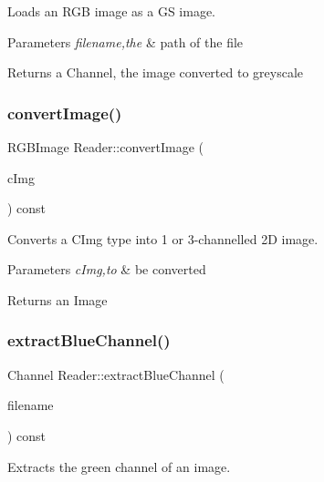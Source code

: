 Loads an R\+GB image as a GS image. 


\begin{DoxyParams}{Parameters}
{\em filename,the} & path of the file \\
\hline
\end{DoxyParams}
\begin{DoxyReturn}{Returns}
a Channel, the image converted to greyscale 
\end{DoxyReturn}
\mbox{\label{class_reader_a1dc6b358f453ec604eec390ea7f67cbd}} 
\subsubsection{\texorpdfstring{convert\+Image()}{convertImage()}}
{\footnotesize\ttfamily R\+G\+B\+Image Reader\+::convert\+Image (\begin{DoxyParamCaption}\item[{C\+Img$<$ int $>$}]{c\+Img }\end{DoxyParamCaption}) const}



Converts a C\+Img type into 1 or 3-\/channelled 2D image. 


\begin{DoxyParams}{Parameters}
{\em c\+Img,to} & be converted \\
\hline
\end{DoxyParams}
\begin{DoxyReturn}{Returns}
an Image 
\end{DoxyReturn}
\mbox{\label{class_reader_a46e2de91ea642d5749eaf7c74f0a1381}} 
\subsubsection{\texorpdfstring{extract\+Blue\+Channel()}{extractBlueChannel()}}
{\footnotesize\ttfamily Channel Reader\+::extract\+Blue\+Channel (\begin{DoxyParamCaption}\item[{std\+::string}]{filename }\end{DoxyParamCaption}) const}



Extracts the green channel of an image. 


